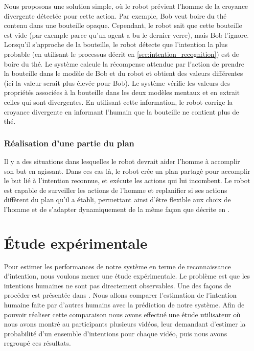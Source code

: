 \documentclass[a4paper,11pt,twoside]{StyleThese}
\begin{document}
Nous proposons une solution simple, où le robot prévient l'homme de la croyance divergente détectée pour cette action. Par exemple, Bob veut boire du thé contenu dans une bouteille opaque. Cependant, le robot sait que cette bouteille est vide (par exemple parce qu'un agent a bu le dernier verre), mais Bob l'ignore. Lorsqu'il s'approche de la bouteille, le robot détecte que l'intention la plus probable (en utilisant le processus décrit en  \ref{sec:intention_recognition}) est de boire du thé. Le système calcule la récompense attendue par l'action de prendre la bouteille dans le modèle de Bob et du robot et obtient des valeurs différentes (ici la valeur serait plus élevée pour Bob). Le système vérifie les valeurs des propriétés associées à la bouteille dans les deux modèles mentaux et en extrait celles qui sont divergentes. En utilisant cette information, le robot corrige la croyance divergente en informant l'humain que la bouteille ne contient plus de thé.


\subsubsection{Réalisation d'une partie du plan}
\label{robot_acts}
Il y a des situations dans lesquelles le robot devrait aider l'homme à accomplir son but en agissant. Dans ces cas là, le robot crée un plan partagé pour accomplir le but lié à l'intention reconnue, et exécute les actions qui lui incombent. Le robot est capable de surveiller les actions de l'homme et replanifier si ses actions diffèrent du plan qu'il a établi, permettant ainsi d'être flexible aux choix de l'homme et de s'adapter dynamiquement de la même façon que décrite en \cite{fioreiser2014}.
\vspace{-5pt}


\section{Étude expérimentale}
\label{sec:experimentsIntent}
Pour estimer les performances de notre système en terme de reconnaissance d'intention, nous voulons mener une étude expérimentale. Le problème est que les intentions humaines ne sont pas directement observables. Une des façons de procéder est présentée dans \cite{baker2014modeling}. Nous allons comparer l'estimation de l'intention humaine faite par d'autres humains avec la prédiction de notre système. Afin de pouvoir réaliser cette comparaison nous avons effectué une étude utilisateur où nous avons montré au participants plusieurs vidéos, leur demandant d'estimer la probabilité d'un ensemble d'intentions pour chaque vidéo, puis nous avons regroupé ces résultats.
\end{document}
